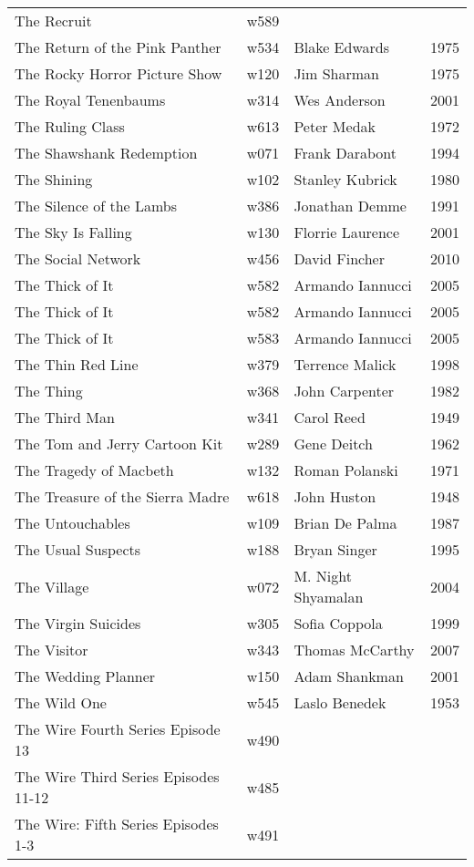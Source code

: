 \documentclass{article}
\begin{document}
\begin {center}
\begin{longtable}{p{10cm} l l l}
The Recruit & w589 &  &  \\
The Return of the Pink Panther & w534 & Blake Edwards & 1975 \\
The Rocky Horror Picture Show & w120 & Jim Sharman & 1975 \\
The Royal Tenenbaums & w314 & Wes Anderson & 2001 \\
The Ruling Class & w613 & Peter Medak & 1972 \\
The Shawshank Redemption & w071 & Frank Darabont & 1994 \\
The Shining & w102 & Stanley Kubrick & 1980 \\
The Silence of the Lambs & w386 & Jonathan Demme & 1991 \\
The Sky Is Falling & w130 & Florrie Laurence & 2001 \\
The Social Network & w456 & David Fincher & 2010 \\
The Thick of It & w582 & Armando Iannucci & 2005 \\
The Thick of It & w582 & Armando Iannucci & 2005 \\
The Thick of It & w583 & Armando Iannucci & 2005 \\
The Thin Red Line & w379 & Terrence Malick & 1998 \\
The Thing & w368 & John Carpenter & 1982 \\
The Third Man & w341 & Carol Reed & 1949 \\
The Tom and Jerry Cartoon Kit & w289 & Gene Deitch & 1962 \\
The Tragedy of Macbeth & w132 & Roman Polanski & 1971 \\
The Treasure of the Sierra Madre & w618 & John Huston & 1948 \\
The Untouchables & w109 & Brian De Palma & 1987 \\
The Usual Suspects & w188 & Bryan Singer & 1995 \\
The Village & w072 & M. Night Shyamalan & 2004 \\
The Virgin Suicides & w305 & Sofia Coppola & 1999 \\
The Visitor & w343 & Thomas McCarthy & 2007 \\
The Wedding Planner & w150 & Adam Shankman & 2001 \\
The Wild One & w545 & Laslo Benedek & 1953 \\
The Wire Fourth Series Episode 13 & w490 &  &  \\
The Wire Third Series Episodes 11-12 & w485 &  &  \\
The Wire: Fifth Series Episodes 1-3 & w491 &  &  \\

\end{longtable}
\end{center}
\end{document}
